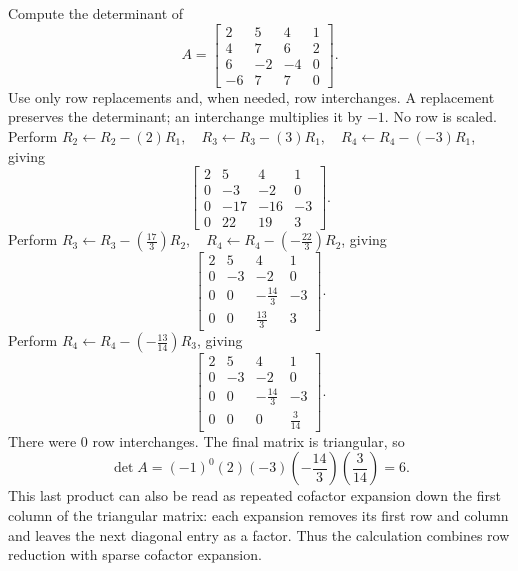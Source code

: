 \goal Compute the determinant of
\[A=\begin{bmatrix}2&5&4&1\\4&7&6&2\\6&-2&-4&0\\-6&7&7&0\end{bmatrix}.\]
Use only row replacements and, when needed, row interchanges. A replacement preserves the determinant; an interchange multiplies it by $-1$. No row is scaled.
Perform $R_2\leftarrow R_2-(2)R_1,\quad R_3\leftarrow R_3-(3)R_1,\quad R_4\leftarrow R_4-(-3)R_1$, giving
\[
\begin{bmatrix}2&5&4&1\\0&-3&-2&0\\0&-17&-16&-3\\0&22&19&3\end{bmatrix}.
\]
Perform $R_3\leftarrow R_3-(\frac{17}{3})R_2,\quad R_4\leftarrow R_4-(- \frac{22}{3})R_2$, giving
\[
\begin{bmatrix}2&5&4&1\\0&-3&-2&0\\0&0&- \frac{14}{3}&-3\\0&0&\frac{13}{3}&3\end{bmatrix}.
\]
Perform $R_4\leftarrow R_4-(- \frac{13}{14})R_3$, giving
\[
\begin{bmatrix}2&5&4&1\\0&-3&-2&0\\0&0&- \frac{14}{3}&-3\\0&0&0&\frac{3}{14}\end{bmatrix}.
\]
There were $0$ row interchanges. The final matrix is triangular, so
\[\det A=(-1)^{0}(2)(-3)(- \frac{14}{3})(\frac{3}{14})=6.\]
This last product can also be read as repeated cofactor expansion down the first column of the triangular matrix: each expansion removes its first row and column and leaves the next diagonal entry as a factor. Thus the calculation combines row reduction with sparse cofactor expansion.


